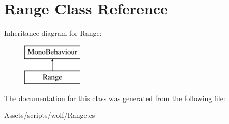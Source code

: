 \hypertarget{class_range}{}\section{Range Class Reference}
\label{class_range}
Inheritance diagram for Range\+:\begin{figure}[H]
\begin{center}
\leavevmode
\includegraphics[height=2.000000cm]{class_range}
\end{center}
\end{figure}


The documentation for this class was generated from the following file\+:\begin{DoxyCompactItemize}
\item 
Assets/scripts/wolf/Range.\+cs\end{DoxyCompactItemize}
